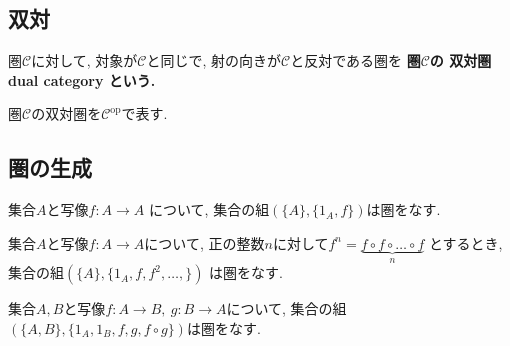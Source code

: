 \subsection{双対}
\begin{Def}
圏$\mathscr{C}$に対して, 対象が$\mathscr{C}$と同じで, 射の向きが$\mathscr{C}$と反対である圏を
\bf{圏$\mathscr{C}$の
双対圏 dual category
}という.
\end{Def}
\begin{Notation}
圏$\mathscr{C}$の双対圏を$\mathscr{C}^{\mathrm{op}}$で表す.
\end{Notation}
\begin{comment}
\begin{caution}
双対の原理
\end{caution}
\end{comment}
\subsection{圏の生成}
\begin{Prop}
集合$A$と写像$f:A\rightarrow A$
について, 集合の組$(\{A\},\{1_A,f\})$は圏をなす.
\end{Prop}
\begin{comment}
\begin{proof}
$\mathrm{dom} f=\mathrm{cod}f$であるから, 合成射$f\circ f$を定めることができる.
このとき$f\circ f=1_A$もしくは$f\circ f=f$である.

$f\circ f=1_A$ならば...

...

となる.
一方, $f\circ f=1_A$ならば...

...

となる.
以上より, いずれの場合も, 射の合成が結合律を満たすことがわかる.
したがって$f\circ f=1_A$と定めても$f\circ f=f$と定めても圏を生成することができる.
\end{proof}
\end{comment}
\begin{Prop}
集合$A$と写像$f:A\rightarrow A$について, 正の整数$n$に対して$f^n=\underbrace{f\circ f \circ \dots \circ f}_{n}$
とするとき,
集合の組$(\{A\},\{1_A,f,f^2,\dots,\})$
は圏をなす.
\end{Prop}
\begin{comment}
\begin{proof}
\end{proof}
\end{comment}
\begin{Prop}
集合$A,B$と写像$f:A\rightarrow B,\ g:B\rightarrow A$について,
集合の組$(\{A,B\}, \{1_A,1_B,f,g,f\circ g\})$は圏をなす.
\end{Prop}
